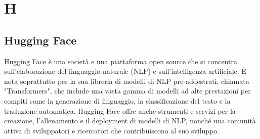 \section{H}

\vspace{2em}
\subsection*{Hugging Face}
\par Hugging Face è una società e una piattaforma open source che si concentra sull'elaborazione del linguaggio naturale (NLP) e sull'intelligenza artificiale. È nota soprattutto per la sua libreria di modelli di NLP pre-addestrati, chiamata "Transformers", che include una vasta gamma di modelli ad alte prestazioni per compiti come la generazione di linguaggio, la classificazione del testo e la traduzione automatica. Hugging Face offre anche strumenti e servizi per la creazione, l'allenamento e il deployment di modelli di NLP, nonché una comunità attiva di sviluppatori e ricercatori che contribuiscono al suo sviluppo.
